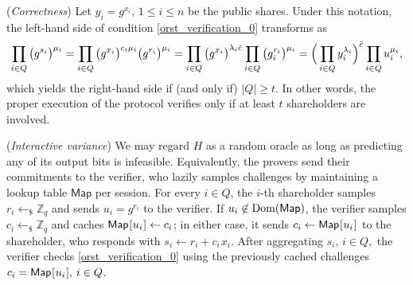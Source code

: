 \documentclass{iacrtrans}
\begin{document}
\begin{rem}\label{orst_correctness}
(\textit{Correctness})
Let $y_i = g ^ {x_i},\hspace{2pt} 1 \le i \le n$
be the public shares.
Under this notation,
the left-hand side of condition \eqref{orst_verification_0}
transforms as
\vspace{5pt}
\begin{equation*}
\prod_{i \in Q} \big(g ^ {s_i }\big) ^ {\mu_i} =
\prod_{i \in Q} \big(g ^ {x_i}\big) ^ {c_i \mu_i} \big(g ^ {r_i}\big) ^ {\mu_i} =
\prod_{i \in Q} \big(g ^ {x_i}\big) ^ {\lambda_i \bar{c}} \prod_{i \in Q} \big(g_i ^ {r_i}\big) ^ {\mu_i} =
\Big(\prod_{i \in Q} y_i ^ {\lambda_i}\Big) ^ {\bar{c}} \prod_{i \in Q} u_i ^ {\mu_i},
\vspace{5pt}
\end{equation*}
which yields the right-hand side if (and only if) $|Q| \ge t$.
In other words, the proper execution of the protocol verifies
only if at least $t$ shareholders are involved.
\end{rem}

\begin{rem}\label{orst_interactive}
(\textit{Interactive variance})
We may regard $H$ as
a random oracle as long as predicting any of its output bits
is infeasible. Equivalently, the provers send their commitments
to the verifier, who lazily samples challenges
by maintaining a lookup table $\mathsf{Map}$ per session.
For every $i \in Q$, the $i$-th shareholder
samples $r_i \leftarrow_\$ \mathbb{Z}_q$
and sends
$u_i = g ^ {r_i}$ to the verifier.
If $u_i \not \in \textup{Dom}(\mathsf{Map})$,
the verifier samples
$c_i \leftarrow_\$ \mathbb{Z}_q$
and caches
$\mathsf{Map}\hspace{0.5pt}
[\hspace{0.5pt}u_i\hspace{0.5pt}]\leftarrow c_i$;
in either case, it sends %
$c_i \leftarrow \mathsf{Map}\hspace{0.5pt}
[\hspace{0.5pt}u_i\hspace{0.5pt}]$
to the shareholder, who responds with
$s_i \leftarrow r_i + c_i\hspace{1pt}x_i$.
After aggregating
$s_i,\hspace{2pt} i \in Q,$
the verifier checks
\eqref{orst_verification_0} using
the previously cached challenges
$c_i = \mathsf{Map}\hspace{0.5pt}
[\hspace{0.5pt}u_i\hspace{0.5pt}],\hspace{2pt} i \in Q$.
\end{rem}
\end{document}
